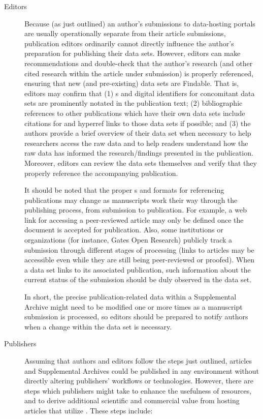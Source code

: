 \documentclass[12pt,letterpaper]{article}
\newcommand{\ATexttclr}[1]{\textcolor{tcolor}{\textbf{#1}}}
\newcommand{\URL}{\resizebox{!}{8pt}{\AcronymText{URL}}}
\newcommand{\textscc}[1]{{\color{orr!35!black}{{%
{\textsc{\textbf{#1}}}}}}}
\newcommand{\AcronymText}[1]{{\textscc{#1}}}
\newcommand{\SDRF}{\resizebox{!}{8pt}{\ATexttclr{S}}\resizebox{!}{8pt}{\ATexttclr{DR%
\hspace{1pt}{\raisebox{-1pt}{\fontfamily{qhv}\fontseries{b}\selectfont{}\Large{F}}%
}}}}
\begin{document}
{{\begin{description}
\item[Editors]  Because (as just outlined) an author's submissions 
to data-hosting portals are usually operationally separate 
from their article submissions, publication 
editors ordinarily cannot directly influence the author's 
preparation for publishing their data sets.  However, 
editors can make recommendations and double-check that 
the author's research (and other cited research  
within the article under submission) is properly referenced, ensuring 
that new (and pre-existing) data sets are 
Findable.  That is, editors may confirm that (1) \URL{}s 
and digital identifiers for concomitant data sets are prominently 
notated in the publication text; (2) bibliographic 
references to other publications which have their own 
data sets include citations for and hyperref links to 
those data sets if possible; and (3) the authors provide 
a brief overview of their data set when necessary 
to help researchers access the raw data and to help 
readers understand how the raw data has informed the 
research/findings presented in the publication.  
Moreover, editors can review the data sets themselves 
and verify that they 
properly reference the accompanying publication. 

It should be noted that the proper \URL{}s and formats 
for referencing publications may change as manuscripts 
work their way through the publishing process, from 
submission to publication.  
For example, a web link for accessing a peer-reviewed 
article may only be defined once the document is 
accepted for publication.  Also, some institutions 
or organizations  
(for instance, Gates Open Research) 
publicly track a submission through different stages 
of processing (links to articles may be accessible  
even while they are still being peer-reviewed or proofed).  
When a data set links to its associated 
publication, such information about the current 
status of the submission should be duly observed in the 
data set.

In short, the precise publication-related data within a 
Supplemental Archive might need to be modified one 
or more times as a manuscript submission is processed, 
so editors should be prepared to notify authors when 
a change within the data set is necessary.

\item[Publishers]  Assuming that authors and 
editors follow the steps just outlined, 
articles and Supplemental Archives could be 
published in any environment without directly altering 
publishers' workflows or technologies.  
However, there are steps which publishers 
might take to enhance the usefulness of \SDRF{} 
resources, and to derive additional scientific 
and commercial value from hosting articles 
that utilize \SDRF{}.  These steps include:


\end{description}}}
\end{document}
